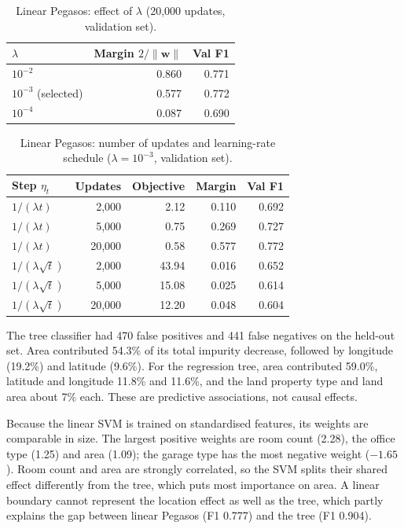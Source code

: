 \documentclass[10pt,twocolumn,a4paper]{article}
\begin{document}
\begin{table}[t]
  \centering
  \caption{Linear Pegasos: effect of $\lambda$ (20,000 updates,
  validation set).}
  \label{tab:svm-lambda}
  \small
  \begin{tabular}{@{}lrr@{}}
    \toprule
    $\lambda$ & Margin $2/\lVert\mathbf{w}\rVert$ & Val F1 \\
    \midrule
    $10^{-2}$ & 0.860 & 0.771 \\
    $10^{-3}$ (selected) & 0.577 & 0.772 \\
    $10^{-4}$ & 0.087 & 0.690 \\
    \bottomrule
  \end{tabular}
\end{table}

\begin{table}[t]
  \centering
  \caption{Linear Pegasos: number of updates and learning-rate schedule
  ($\lambda=10^{-3}$, validation set).}
  \label{tab:svm-schedule}
  \small
  \begin{tabular}{@{}lrrrr@{}}
    \toprule
    Step $\eta_t$ & Updates & Objective & Margin & Val F1 \\
    \midrule
    $1/(\lambda t)$ & 2,000 & 2.12 & 0.110 & 0.692 \\
    $1/(\lambda t)$ & 5,000 & 0.75 & 0.269 & 0.727 \\
    $1/(\lambda t)$ & 20,000 & 0.58 & 0.577 & 0.772 \\
    $1/(\lambda\sqrt{t})$ & 2,000 & 43.94 & 0.016 & 0.652 \\
    $1/(\lambda\sqrt{t})$ & 5,000 & 15.08 & 0.025 & 0.614 \\
    $1/(\lambda\sqrt{t})$ & 20,000 & 12.20 & 0.048 & 0.604 \\
    \bottomrule
  \end{tabular}
\end{table}

The tree classifier had 470 false positives and 441 false negatives on
the held-out set. Area contributed 54.3\% of its total impurity decrease,
followed by longitude (19.2\%) and latitude (9.6\%). For the regression
tree, area contributed 59.0\%, latitude and longitude 11.8\% and 11.6\%,
and the land property type and land area about 7\% each. These are
predictive associations, not causal effects.

Because the linear SVM is trained on standardised features, its weights
are comparable in size. The largest positive weights are room count
(2.28), the office type (1.25) and area (1.09); the garage type has the
most negative weight ($-1.65$). Room count and area are strongly
correlated, so the SVM splits their shared effect differently from the
tree, which puts most importance on area. A linear boundary cannot
represent the location effect as well as the tree, which partly explains
the gap between linear Pegasos (F1 0.777) and the tree (F1 0.904).
\end{document}
